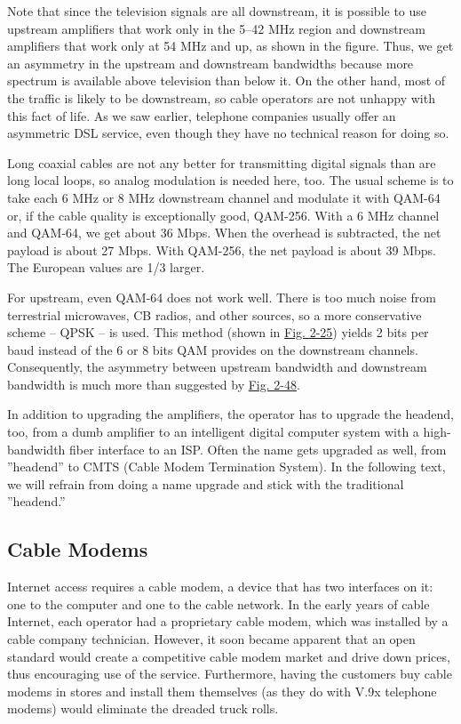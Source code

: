 \documentclass[b5paper,11pt]{memoir}
\begin{document}
Note that since the television signals are all downstream, it is
possible to use upstream amplifiers that work only in the 5--42 MHz
region and downstream amplifiers that work only at 54 MHz and up, as
shown in the figure. Thus, we get an asymmetry in the upstream and
downstream bandwidths because more spectrum is available above
television than below it. On the other hand, most of the traffic is
likely to be downstream, so cable operators are not unhappy with this
fact of life. As we saw earlier, telephone companies usually offer an
asymmetric DSL service, even though they have no technical reason for
doing so.

Long coaxial cables are not any better for transmitting digital signals
than are long local loops, so analog modulation is needed here, too. The
usual scheme is to take each 6 MHz or 8 MHz downstream channel and
modulate it with QAM-64 or, if the cable quality is exceptionally good,
QAM-256. With a 6 MHz channel and QAM-64, we get about 36 Mbps. When the
overhead is subtracted, the net payload is about 27 Mbps. With QAM-256,
the net payload is about 39 Mbps. The European values are 1/3 larger.

For upstream, even QAM-64 does not work well. There is too much noise
from terrestrial microwaves, CB radios, and other sources, so a more
conservative scheme -- QPSK -- is used. This method (shown in
\protect\hyperlink{0130661023_ch02lev1sec6.htmlux5cux23ch02fig45}{Fig.
2-25}) yields 2 bits per baud instead of the 6 or 8 bits QAM provides on
the downstream channels. Consequently, the asymmetry between upstream
bandwidth and downstream bandwidth is much more than suggested by
\protect\hyperlink{0130661023_ch02lev1sec7.htmlux5cux23ch02fig48}{Fig.
2-48}.

In addition to upgrading the amplifiers, the operator has to upgrade the
headend, too, from a dumb amplifier to an intelligent digital computer
system with a high-bandwidth fiber interface to an ISP. Often the name
gets upgraded as well, from ''headend'' to {CMTS} ({Cable Modem
Termination System}). In the following text, we will refrain from doing
a name upgrade and stick with the traditional ''headend.''

\protect\hypertarget{0130661023_ch02lev1sec7.htmlux5cux23ch02lev2sec28}{}{}

\subsection{Cable Modems}

Internet access requires a cable modem, a device that has two interfaces
on it: one to the computer and one to the cable network. In the early
years of cable Internet, each operator had a proprietary cable modem,
which was installed by a cable company technician. However, it soon
became apparent that an open standard would create a competitive cable
modem market and drive down prices, thus encouraging use of the service.
Furthermore, having the customers buy cable modems in stores and install
them themselves (as they do with V.9x telephone modems) would eliminate
the dreaded truck rolls.
\end{document}
